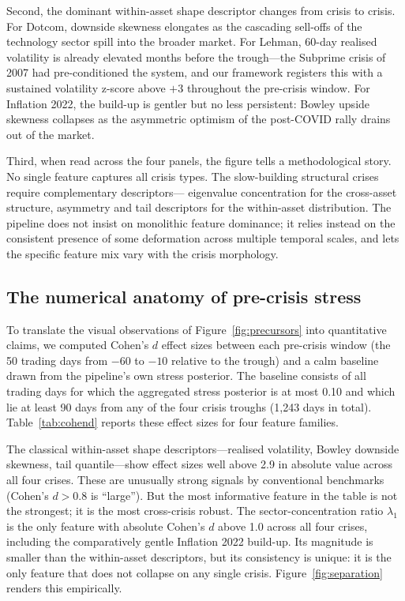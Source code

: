 \documentclass[11pt]{article}
\begin{document}
Second, the dominant within-asset shape descriptor changes from crisis
to crisis. For Dotcom, downside skewness elongates as the cascading
sell-offs of the technology sector spill into the broader market. For
Lehman, 60-day realised volatility is already elevated months before the
trough---the Subprime crisis of 2007 had pre-conditioned the system, and
our framework registers this with a sustained volatility z-score above
$+3$ throughout the pre-crisis window. For Inflation 2022, the build-up
is gentler but no less persistent: Bowley upside skewness collapses as
the asymmetric optimism of the post-COVID rally drains out of the
market.

Third, when read across the four panels, the figure tells a
methodological story. No single feature captures all crisis types. The
slow-building structural crises require complementary descriptors---
eigenvalue concentration for the cross-asset structure, asymmetry and
tail descriptors for the within-asset distribution. The pipeline does
not insist on monolithic feature dominance; it relies instead on the
consistent presence of some deformation across multiple temporal scales,
and lets the specific feature mix vary with the crisis morphology.

\subsection{The numerical anatomy of pre-crisis stress}
\label{sec:anatomy}

To translate the visual observations of Figure~\ref{fig:precursors} into
quantitative claims, we computed Cohen's $d$ effect sizes between each
pre-crisis window (the 50 trading days from $-60$ to $-10$ relative to
the trough) and a calm baseline drawn from the pipeline's own stress
posterior. The baseline consists of all trading days for which the
aggregated stress posterior is at most 0.10 and which lie at least 90
days from any of the four crisis troughs (1{,}243 days in total).
Table~\ref{tab:cohend} reports these effect sizes for four feature
families.

The classical within-asset shape descriptors---realised volatility,
Bowley downside skewness, tail quantile---show effect sizes well above
2.9 in absolute value across all four crises. These are unusually strong
signals by conventional benchmarks (Cohen's $d > 0.8$ is ``large'').
But the most informative feature in the table is not the strongest; it
is the most cross-crisis robust. The sector-concentration ratio
$\lambda_1$ is the only feature with absolute Cohen's $d$ above 1.0
across all four crises, including the comparatively gentle Inflation 2022
build-up. Its magnitude is smaller than the within-asset descriptors, but
its consistency is unique: it is the only feature that does not collapse
on any single crisis. Figure~\ref{fig:separation} renders this
empirically.
\end{document}
